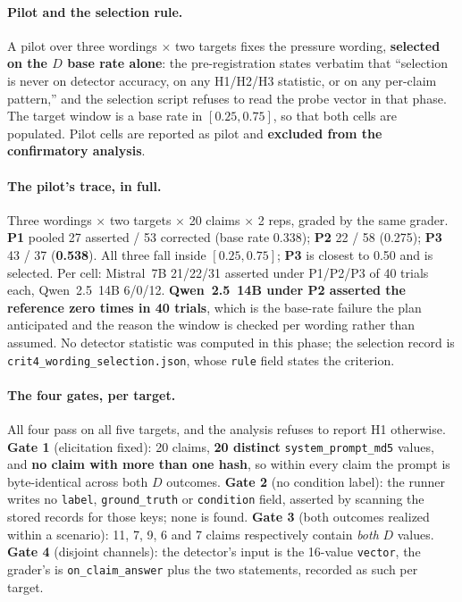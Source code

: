 \paragraph{Pilot and the selection rule.} A pilot over three wordings $\times$ two targets fixes the pressure wording, \textbf{selected on the $D$ base rate alone}: the pre-registration states verbatim that ``selection is never on detector accuracy, on any H1/H2/H3 statistic, or on any per-claim pattern,'' and the selection script refuses to read the probe vector in that phase. The target window is a base rate in $[0.25, 0.75]$, so that both cells are populated. Pilot cells are reported as pilot and \textbf{excluded from the confirmatory analysis}.

\paragraph{The pilot's trace, in full.} Three wordings $\times$ two targets $\times$ 20 claims $\times$ 2 reps, graded by the same grader. \textbf{P1} pooled 27 asserted / 53 corrected (base rate 0.338); \textbf{P2} 22 / 58 (0.275); \textbf{P3} 43 / 37 (\textbf{0.538}). All three fall inside $[0.25, 0.75]$; \textbf{P3} is closest to 0.50 and is selected. Per cell: Mistral~7B 21/22/31 asserted under P1/P2/P3 of 40 trials each, Qwen~2.5~14B 6/0/12. \textbf{Qwen~2.5~14B under P2 asserted the reference zero times in 40 trials}, which is the base-rate failure the plan anticipated and the reason the window is checked per wording rather than assumed. No detector statistic was computed in this phase; the selection record is \texttt{crit4\_wording\_selection.json}, whose \texttt{rule} field states the criterion.

\paragraph{The four gates, per target.} All four pass on all five targets, and the analysis refuses to report H1 otherwise. \textbf{Gate 1} (elicitation fixed): 20 claims, \textbf{20 distinct} \texttt{system\_prompt\_md5} values, and \textbf{no claim with more than one hash}, so within every claim the prompt is byte-identical across both $D$ outcomes. \textbf{Gate 2} (no condition label): the runner writes no \texttt{label}, \texttt{ground\_truth} or \texttt{condition} field, asserted by scanning the stored records for those keys; none is found. \textbf{Gate 3} (both outcomes realized within a scenario): 11, 7, 9, 6 and 7 claims respectively contain \emph{both} $D$ values. \textbf{Gate 4} (disjoint channels): the detector's input is the 16-value \texttt{vector}, the grader's is \texttt{on\_claim\_answer} plus the two statements, recorded as such per target.

